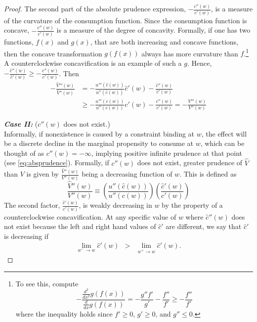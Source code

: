 \begin{proof}
	The second part of the absolute prudence expression, $-\frac{c''(w)}{c'(w)}$, is a measure of the curvature of the consumption function. Since the consumption function is concave, $-\frac{c''(w)}{c'(w)}$ is a measure of the degree of concavity. Formally, if one has two functions, $f(x)$ and $g(x)$, that are both increasing and concave functions, then the concave transformation $g(f(x))$ always has more curvature than $f$.\footnote{To see this, compute \[-\frac{\frac{d^2}{dx^2} g(f(x))}{\frac{d}{dx}g(f(x))} = - \frac{g''f'}{g'} - \frac{f''}{f'} \geq - \frac{f''}{f'}\] where the inequality holds since $f' \geq 0$, $g' \geq 0$, and $g'' \leq 0$.} A counterclockwise concavification is an example of such a $g$. Hence, $-\frac{\hat{c}''(w)}{\hat{c}'(w)} \geq -\frac{c''(w)}{c'(w)}$. Then
	\begin{align*}
	-\frac{\hat{V}'''(w)}{\hat{V}''(w)} &= -\frac{u'''(\hat{c}(w))}{u''(\hat{c}(w))}\hat{c}'(w) - \frac{\hat{c}''(w)}{\hat{c}'(w)} \\
	&\geq -\frac{u'''(c(w))}{u''(c(w))}c'(w) - \frac{c''(w)}{c'(w)} = -\frac{V'''(w)}{V''(w)}
	\end{align*}
	
	\bigskip
	\noindent \textbf{\textit{Case II:}} ($c''(w)$ does not exist.)\\
	Informally, if nonexistence is caused by a constraint binding at $w$, the effect will be a discrete decline in the marginal propensity to consume at $w$, which can be thought of as $c''(w) = -\infty$, implying positive infinite prudence at that point (see \eqref{eq:absprudence}). Formally, if $c''(w)$ does not exist, greater prudence of $\hat{V}$ than $V$ is given by $\frac{\hat{V}''(w)}{V''(w)}$ being a decreasing function of $w$. This is defined as
	\[\frac{\hat{V}''(w)}{V''(w)} \equiv
	\left(\frac{u''(\hat c(w))}{u''(c(w))} \right)
	\left(\frac{\hat{c}'(w)}{c'(w)}\right)\]
	The second factor, $\frac{\hat{c}'(w)}{c'(w)}$, is weakly decreasing in $w$ by the property of a counterclockwise concavification. At any specific value of $w$ where
	$\hat{c}''(w)$ does not exist because the left and right hand
	values of $\hat{c}'$ are different, we say that $\hat{c}'$
	is decreasing if
	\begin{eqnarray}
	\lim_{w^{-} \rightarrow w} \hat{c}'(w) & > & \lim_{w^{+} \rightarrow w} \hat{c}'(w).
	\end{eqnarray}
	

\end{proof}
